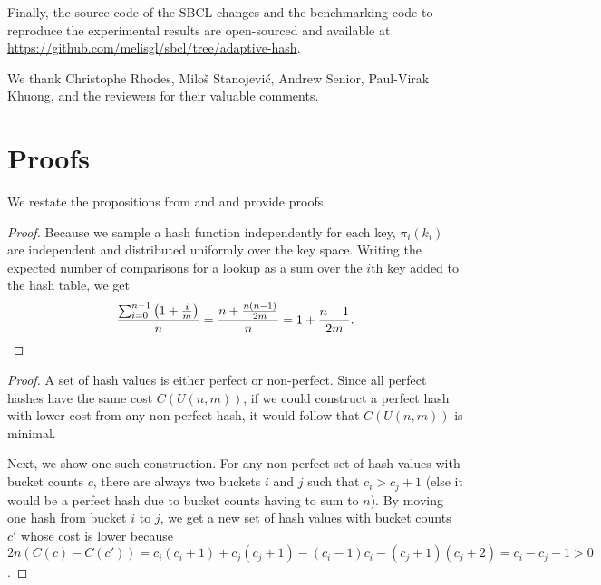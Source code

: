 \documentclass[sigconf]{acmart}
\renewcommand{\label}[1]{%
    \gdef\sfname{sf:##1}}%
\begin{document}
Finally, the source code of the SBCL changes and the benchmarking code to reproduce the experimental results are open-sourced and available at \url{https://github.com/melisgl/sbcl/tree/adaptive-hash}.


\begin{acks}
We thank Christophe Rhodes, Miloš Stanojević, Andrew Senior, Paul-Virak Khuong, and the reviewers for their valuable comments.
\end{acks}




\appendix


\section{Proofs}
\label{sec:proofs}

We restate the propositions from  and  and provide proofs.

\propexpectedcostofuh*
\begin{proof}
Because we sample a hash function independently for each key, $\pi_i(k_i)$ are independent and distributed uniformly over the key space.
Writing the expected number of comparisons for a lookup as a sum over the $i$th key added to the hash table, we get
\begin{equation*}
\frac{\sum_{i=0}^{n-1} \big(1 + \frac{i}{m}\big)}{n} = \frac{n + \frac{n(n-1)}{2m}}{n} = 1+\frac{n-1}{2m}.
\qedhere
\end{equation*}
\end{proof}

\propperfecthasheshaveminimalcost*
\begin{proof}
A set of hash values is either perfect or non-perfect.
Since all perfect hashes have the same cost $C(U(n,m))$, if we could construct a perfect hash with lower cost from any non-perfect hash, it would follow that $C(U(n,m))$ is minimal.

Next, we show one such construction.
For any non-perfect set of hash values with bucket counts $c$, there are always two buckets $i$ and $j$ such that $c_i > c_j + 1$ (else it would be a perfect hash due to bucket counts having to sum to $n$).
By moving one hash from bucket $i$ to $j$, we get a new set of hash values with bucket counts $c'$ whose cost is lower because $2n(C(c)-C(c'))=c_i(c_i+1) + c_j(c_j+1) - (c_i-1)c_i - (c_j+1)(c_j+2) = c_i - c_j - 1 > 0$.
\end{proof}
\end{document}
